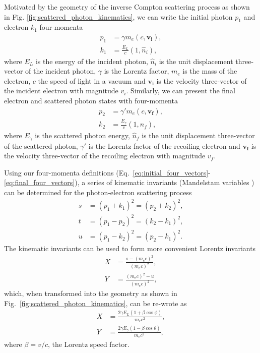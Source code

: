 \documentclass[../main.tex]{subfiles}
\begin{document}
Motivated by the geometry of the inverse Compton scattering process as shown in Fig. \ref{fig:scattered_photon_kinematics}, we can write the initial photon $p_{1}$ and electron $k_{1}$ four-momenta
\begin{align}
p_{1} &= \gamma m_{e}\left(c,\boldsymbol{v_{i}}\right),
\label{eq:initial_four_vectors} \\
k_{1} &= \frac{E_{L}}{c}\left(1,\hat{n}_{i}\right), 
\end{align}
where $E_{L}$ is the energy of the incident photon, $\hat{n}_{i}$ is the unit displacement three-vector of the incident photon, $\gamma$ is the Lorentz factor, $m_{e}$ is the mass of the electron, $c$ the speed of light in a vacuum and $\boldsymbol{v_{i}}$ is the velocity three-vector of the incident electron with magnitude $v_{i}$. Similarly, we can present the final electron and scattered photon states with four-momenta 
\begin{align}
p_{2} &= \gamma' m_{e}\left(c,\boldsymbol{v_{f}}\right), \\
k_{2} &= \frac{E_{\gamma}}{c}\left(1,\hat{n}_{f}\right), 
\label{eq:final_four_vectors} 
\end{align}
where $E_{\gamma}$ is the scattered photon energy, $\hat{n}_{f}$ is the unit displacement three-vector of the scattered photon, $\gamma'$ is the Lorentz factor of the recoiling electron and $\boldsymbol{v_{f}}$ is the velocity three-vector of the recoiling electron with magnitude $v_{f}$.

Using our four-momenta definitions (Eq.~\ref{eq:initial_four_vectors}-\ref{eq:final_four_vectors}), a  series of kinematic invariants (Mandelstam variables \cite{mandelstam1958determination}) can be determined for the photon-electron scattering process \cite{berestetskii1982quantum}
\begin{align}
s &= \left(p_{1}+k_{1}\right)^{2} = \left(p_{2}+k_{2}\right)^{2},
\label{eq:s_Mandelstam} \\
t &= \left(p_{1}-p_{2}\right)^{2} = \left(k_{2}-k_{1}\right)^{2},
\label{eq:t_Mandelstam} \\
u &= \left(p_{1}-k_{2}\right)^{2} = \left(p_{2}-k_{1}\right)^{2}.
\label{eq:u_Mandelstam}
\end{align}
The kinematic invariants can be used to form more convenient Lorentz invariants
\begin{align}
X &= \frac{s-\left(m_{e}c\right)^{2}}{\left(m_{e}c\right)^{2}},
\label{eq:X_Mandelstam} \\
Y &= \frac{\left(m_{e}c\right)^{2}-u}{\left(m_{e}c\right)^{2}},
\label{eq:Y_Mandelstam}
\end{align}
which, when transformed into the geometry as shown in Fig.~\ref{fig:scattered_photon_kinematics}, can be re-wrote as
\begin{align}
X &= \frac{2\gamma E_{L}\left(1+\beta\cos\phi\right)}{m_{e}c^{2}},
\label{eq:X_geometry} \\
Y &= \frac{2\gamma E_{\gamma}\left(1-\beta\cos\theta\right)}{m_{e}c^{2}},
\label{eq:Y_geometry}
\end{align}
where $\beta = v/c$, the Lorentz speed factor.
\end{document}
